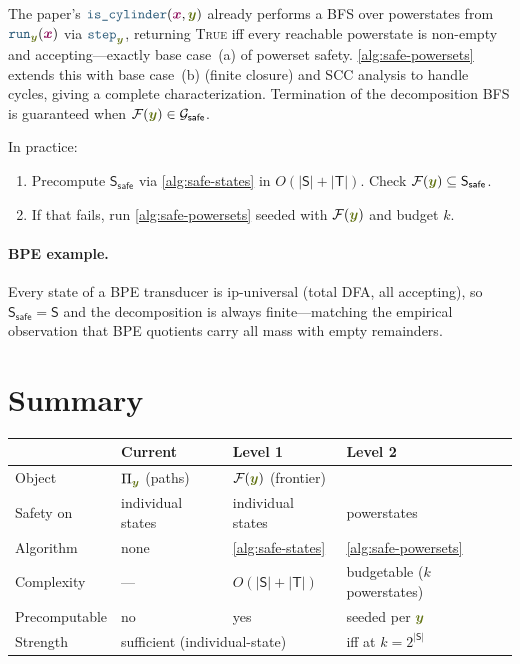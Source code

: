 \documentclass{article}
\newcommand{\mymacro}[1]{#1}
\newcommand{\srcStr}{\ensuremath{{\color{TokenColor}\boldsymbol{x}}}\xspace}
\newcommand{\tgtStr}{{\color{CharacterColor}\boldsymbol{y}}}
\newcommand{\States}{\mymacro{\mathsf{S}}}
\newcommand{\Transitions}{\mymacro{\mathsf{T}}}
\newcommand{\frontier}{\mathcal{F}}
\newcommand{\Paths}{\mymacro{\Pi}}
\newcommand{\isCylinder}{\mbox{\texttt{{\color{StormBlue}is\_cylinder}}}}
\newcommand{\run}{\mbox{\texttt{{\color{StormBlue}run}}}}
\newcommand{\step}{\mbox{\texttt{{\color{StormBlue}step}}}}
\newcommand{\SafeStates}{\States_{\mathsf{safe}}}
\newcommand{\SafePower}{\mathcal{G}_{\mathsf{safe}}}
\theoremstyle{plain}
\begin{document}
The paper's $\isCylinder(\srcStr, \tgtStr)$ already performs a BFS over
powerstates from $\run_{\tgtStr}(\srcStr)$ via $\step_{\tgtStr}$, returning
\textsc{True} iff every reachable powerstate is non-empty and
accepting---exactly base case~(a) of powerset safety.
\cref{alg:safe-powersets} extends this with base case~(b) (finite closure) and
SCC analysis to handle cycles, giving a complete characterization.
Termination of the decomposition BFS is guaranteed when
$\frontier(\tgtStr) \in \SafePower$.

In practice:
\begin{enumerate}
\item Precompute $\SafeStates$ via \cref{alg:safe-states} in $O(|\States| + |\Transitions|)$.
  Check $\frontier(\tgtStr) \subseteq \SafeStates$.
\item If that fails, run \cref{alg:safe-powersets} seeded with $\frontier(\tgtStr)$
  and budget $k$.
\end{enumerate}

\paragraph{BPE example.}
Every state of a BPE transducer is ip-universal (total DFA, all accepting), so
$\SafeStates = \States$ and the decomposition is always finite---matching the
empirical observation that BPE quotients carry all mass with empty remainders.


\section{Summary}

\begin{center}
\renewcommand{\arraystretch}{1.3}
\begin{tabular}{@{}llll@{}}
\toprule
& \textbf{Current} & \textbf{Level 1} & \textbf{Level 2} \\
\midrule
Object & $\Paths_{\tgtStr}$ (paths) & \multicolumn{2}{l}{$\frontier(\tgtStr)$ (frontier)} \\
Safety on & individual states & individual states & powerstates \\
Algorithm & none & \cref{alg:safe-states} & \cref{alg:safe-powersets} \\
Complexity & --- & $O(|\States|{+}|\Transitions|)$ & budgetable ($k$ powerstates) \\
Precomputable & no & yes & seeded per $\tgtStr$ \\
Strength & \multicolumn{2}{l}{sufficient (individual-state)} & iff at $k{=}2^{|\States|}$ \\
\bottomrule
\end{tabular}
\end{center}
\end{document}
